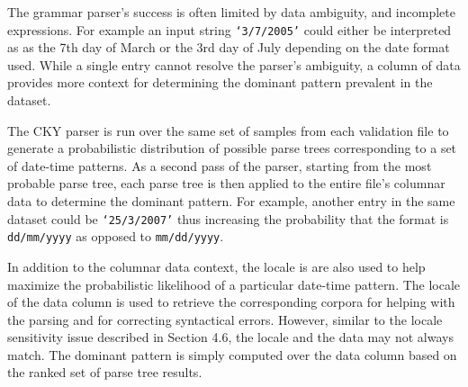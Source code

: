 The grammar parser's success is often limited by data ambiguity, and incomplete expressions. For example an input string \texttt{`3/7/2005'} could either be interpreted as as the 7th day of March or the 3rd day of July depending on the date format used. While a single entry cannot resolve the parser's ambiguity, a column of data provides more context for determining the dominant pattern prevalent in the dataset. 

The CKY parser is run over the same set of samples from each validation file to generate a probabilistic distribution of possible parse trees corresponding to a set of date-time patterns. As a second pass of the parser, starting from the most probable parse tree, each parse tree is then applied to the entire file's columnar data to determine the dominant pattern. For example, another entry in the same dataset could be \texttt{`25/3/2007'} thus increasing the probability that the format is \texttt{dd/mm/yyyy} as opposed to \texttt{mm/dd/yyyy}.

In addition to the  columnar data context, the locale is are also used to help maximize the probabilistic likelihood of a particular date-time pattern. The locale of the data column is used to retrieve the corresponding corpora for helping with the parsing and for correcting syntactical errors. However, similar to the locale sensitivity issue described in Section 4.6, the locale and the data may not always match. The dominant pattern is simply computed over the data column based on the ranked set of parse tree results.
